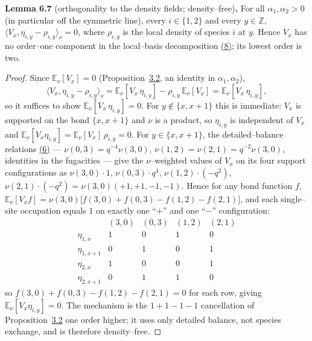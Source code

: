 \documentclass[11pt]{article}
\theoremstyle{plain}
\theoremstyle{definition}
\theoremstyle{remark}
\newcommand{\Z}{\mathbb{Z}}\newcommand{\R}{\mathbb{R}}\newcommand{\N}{\mathbb{N}}
\newcommand{\E}{\mathbb{E}}\newcommand{\PP}{\mathbb{P}}\newcommand{\dd}{\,\mathrm{d}}
\newcommand{\ip}[2]{\langle #1,#2\rangle_\nu}\newcommand{\bone}{\mathbf 1}
\begin{document}
\label{lem_orth}\noindent\textbf{Lemma 6.7} (orthogonality to the density fields; density--free)\textbf{.} 
For all $\alpha_1,\alpha_2>0$ (in particular off the symmetric line), every
$i\in\{1,2\}$ and every $y\in\Z$, $\ip{V_x}{\eta_{i,y}-\rho_{i,y}}=0$, where
$\rho_{i,y}$ is the local density of species $i$ at $y$. Hence $V_x$ has no order--one
component in the local--basis decomposition \hyperref[eq_Dfac]{(8)}; its lowest order is two.
\par
\begin{proof}
Since $\E_\nu[V_x]=0$ (Proposition~\hyperref[prop_cross]{3.2}, an identity in $\alpha_1,\alpha_2$),
\[
  \ip{V_x}{\eta_{i,y}-\rho_{i,y}}=\E_\nu[V_x\,\eta_{i,y}]-\rho_{i,y}\,\E_\nu[V_x]
  =\E_\nu[V_x\,\eta_{i,y}],
\]
so it suffices to show $\E_\nu[V_x\,\eta_{i,y}]=0$. For $y\notin\{x,x+1\}$ this is
immediate: $V_x$ is supported on the bond $\{x,x+1\}$ and $\nu$ is a product, so
$\eta_{i,y}$ is independent of $V_x$ and $\E_\nu[V_x\eta_{i,y}]=\E_\nu[V_x]\,\rho_{i,y}=0$.
For $y\in\{x,x+1\}$, the detailed--balance relations \hyperref[eq_dbrel]{(6)} ---
$\nu(0,3)=q^{-4}\nu(3,0)$, $\nu(1,2)=\nu(2,1)=q^{-2}\nu(3,0)$, identities in the
fugacities --- give the $\nu$--weighted values of $V_x$ on its four support
configurations as $\nu(3,0)\cdot1$, $\nu(0,3)\cdot q^4$, $\nu(1,2)\cdot(-q^2)$,
$\nu(2,1)\cdot(-q^2)=\nu(3,0)(+1,+1,-1,-1)$. Hence for any bond function $f$,
$\E_\nu[V_x f]=\nu(3,0)\big[f(3,0)+f(0,3)-f(1,2)-f(2,1)\big]$, and each single--site
occupation equals $1$ on exactly one ``$+$'' and one ``$-$'' configuration:
\[
  \begin{array}{c|cccc}
   & (3,0) & (0,3) & (1,2) & (2,1)\\\hline
   \eta_{1,x}   & 1 & 0 & 1 & 0\\
   \eta_{1,x+1} & 0 & 1 & 0 & 1\\
   \eta_{2,x}   & 1 & 0 & 0 & 1\\
   \eta_{2,x+1} & 0 & 1 & 1 & 0
  \end{array}
\]
so $f(3,0)+f(0,3)-f(1,2)-f(2,1)=0$ for each row, giving $\E_\nu[V_x\eta_{i,y}]=0$. The
mechanism is the $1+1-1-1$ cancellation of Proposition~\hyperref[prop_cross]{3.2} one order
higher; it uses only detailed balance, not species exchange, and is therefore
density--free.


\end{proof}
\end{document}
